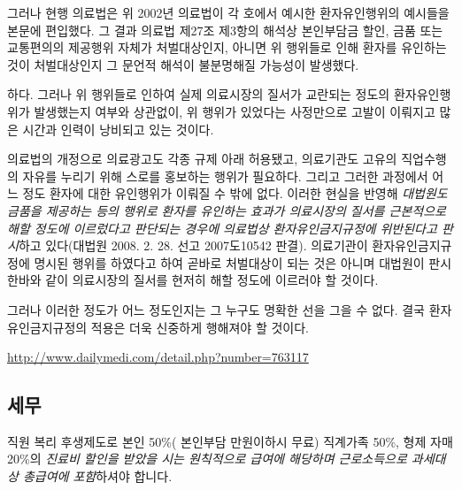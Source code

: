 {그러나 현행 의료법은 위 2002년 의료법이 각 호에서 예시한 환자유인행위의 예시들을 본문에 편입했다. 그 결과 의료법 제27조 제3항의 해석상 본인부담금 할인, 금품 또는 교통편의의 제공행위 자체가 처벌대상인지, 아니면 위 행위들로 인해 환자를 유인하는 것이 처벌대상인지 그 문언적 해석이 불분명해질 가능성이 발생했다. \par
{}하다. 그러나 위 행위들로 인하여 실제 의료시장의 질서가 교란되는 정도의 환자유인행위가 발생했는지 여부와 상관없이, 위 행위가 있었다는 사정만으로 고발이 이뤄지고 많은 시간과 인력이 낭비되고 있는 것이다. \par
의료법의 개정으로 의료광고도 각종 규제 아래 허용됐고, 의료기관도 고유의 직업수행의 자유를 누리기 위해 스로를 홍보하는 행위가 필요하다. 그리고 그러한 과정에서 어느 정도 환자에 대한 유인행위가 이뤄질 수 밖에 없다. 이러한 현실을 반영해 \emph{대법원도 금품을 제공하는 등의 행위로 환자를 유인하는 효과가 의료시장의 질서를 근본적으로 해할 정도에 이르렀다고 판단되는 경우에 의료법상 환자유인금지규정에 위반된다고 판시}하고 있다(대법원 2008. 2. 28. 선고 2007도10542 판결). 의료기관이 환자유인금지규정에 명시된 행위를 하였다고 하여 곧바로 처벌대상이 되는 것은 아니며 대법원이 판시한바와 같이 의료시장의 질서를 현저히 해할 정도에 이르러야 할 것이다. \par
그러나 이러한 정도가 어느 정도인지는 그 누구도 명확한 선을 그을 수 없다. 결국 환자유인금지규정의 적용은 더욱 신중하게 행해져야 할 것이다.
\par
\medskip
\url{http://www.dailymedi.com/detail.php?number=763117}
}



\subsection{세무}
직원 복리 후생제도로 본인 50\%( 본인부담 만원이하시 무료) 직계가족 50\%, 형제 자매 20\%의 \emph{진료비 할인을 받았을 시는 원칙적으로 급여에 해당하며 근로소득으로 과세대상 총급여에 포함}하셔야 합니다. \par
{} 

